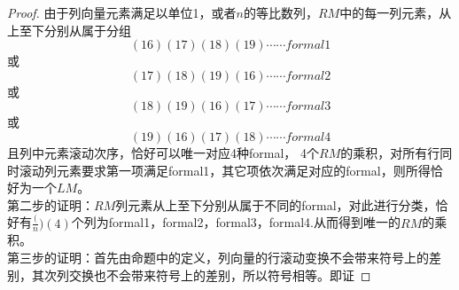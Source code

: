 \documentclass[twoside,a4paper,CCT]{cctart}   %
\begin{document}
\begin{proof}
由于列向量元素满足以单位1，或者$n$的等比数列，$RM$中的每一列元素，从上至下分别从属于分组
\begin{equation*}(16)(17)(18)(19)\cdots \cdots formal1\end{equation*}或
\begin{equation*}(17)(18)(19)(16)\cdots \cdots formal2\end{equation*}或
\begin{equation*}(18)(19)(16)(17)\cdots \cdots formal3\end{equation*}或
\begin{equation*}(19)(16)(17)(18)\cdots \cdots formal4\end{equation*}
且列中元素滚动次序，恰好可以唯一对应4种formal，
 4个$RM$的乘积，对所有行同时滚动列元素要求第一项满足formal1，其它项依次满足对应的formal，则所得恰好为一个$LM$。\\
第二步的证明：$RM$列元素从上至下分别从属于不同的formal，对此进行分类，恰好有$\frac(n)(4)$个列为formal1，formal2，formal3，formal4.从而得到唯一的$RM$的乘积。\\
第三步的证明：首先由命题中的定义，列向量的行滚动变换不会带来符号上的差别，其次列交换也不会带来符号上的差别，所以符号相等。即证

\end{proof}
\end{document}
